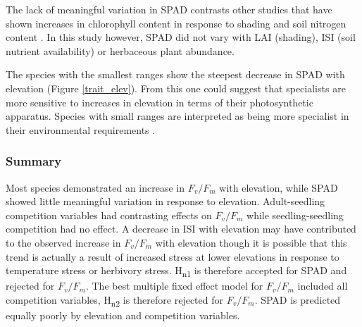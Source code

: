 \documentclass[a4paper, 11pt]{article}
\begin{document}
The lack of meaningful variation in SPAD contrasts other studies that have shown increases in chlorophyll content in response to shading \citep{Brand1997, Rijkers2000, Rozendaal2006, Dai2009, Zervoudakis2012} and soil nitrogen content \citep{Cechin2004}. In this study however, SPAD did not vary with LAI (shading), ISI (soil nutrient availability) or herbaceous plant abundance. 

The species with the smallest ranges show the steepest decrease in SPAD with elevation (Figure \ref{trait_elev}). From this one could suggest that specialists are more sensitive to increases in elevation in terms of their photosynthetic apparatus. Species with small ranges are interpreted as being more specialist in their environmental requirements \citep{Thuiller2005}.

\subsubsection*{Summary}
Most species demonstrated an increase in $F_v/F_m$ with elevation, while SPAD showed little meaningful variation in response to elevation. Adult-seedling competition variables had contrasting effects on $F_v/F_m$ while seedling-seedling competition had no effect. A decrease in ISI with elevation may have contributed to the observed increase in $F_v/F_m$ with elevation though it is possible that this trend is actually a result of increased stress at lower elevations in response to temperature stress or herbivory stress. H\textsubscript{n1} is therefore accepted for SPAD and rejected for $F_v/F_m$. The best multiple fixed effect model for $F_v/F_m$ included all competition variables, H\textsubscript{n2} is therefore rejected for $F_v/F_m$. SPAD is predicted equally poorly by elevation and competition variables.
\end{document}

